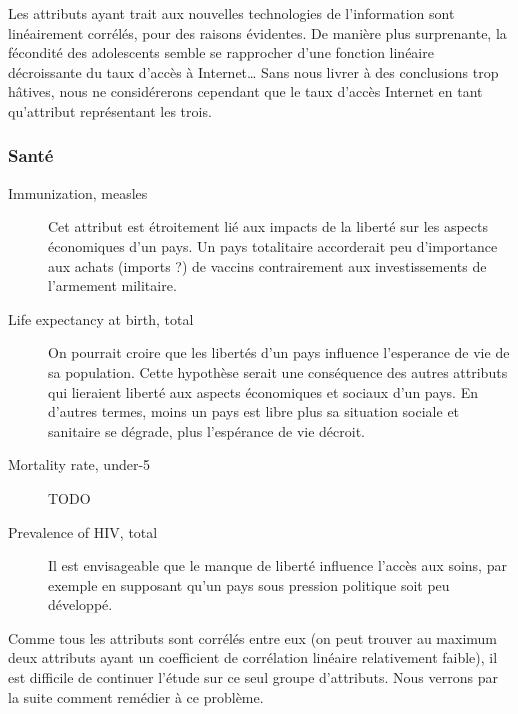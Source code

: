 Les attributs ayant trait aux nouvelles technologies de l'information sont linéairement corrélés, pour des raisons évidentes. De manière plus surprenante, la fécondité des adolescents semble se rapprocher d'une fonction linéaire décroissante du taux d'accès à Internet\ldots
Sans nous livrer à des conclusions trop hâtives, nous ne considérerons cependant que le taux d'accès Internet en tant qu'attribut représentant les trois.

\subsubsection{Santé}
\begin{description}
\item [Immunization, measles]
Cet attribut est étroitement lié aux impacts de la liberté sur les aspects économiques d'un pays. Un pays totalitaire
accorderait peu d'importance aux achats (imports ?) de vaccins contrairement aux investissements de l'armement militaire.
\item [Life expectancy at birth, total]
On pourrait croire que les libertés d'un pays influence l'esperance de vie de sa population. Cette hypothèse serait une conséquence
des autres attributs qui lieraient liberté aux aspects économiques et sociaux d'un pays. En d'autres termes, moins un pays est libre plus sa situation sociale et sanitaire se dégrade, plus l'espérance de vie décroit.
\item [Mortality rate, under-5]
{\huge TODO}
\item [Prevalence of HIV, total]
Il est envisageable que le manque de liberté influence l'accès aux soins, par exemple en supposant qu'un pays sous pression politique soit peu développé.
\end{description}

Comme tous les attributs sont corrélés entre eux (on peut trouver au maximum deux attributs ayant un coefficient de corrélation linéaire relativement faible), il est difficile de continuer l'étude sur ce seul groupe d'attributs. Nous verrons par la suite comment remédier à ce problème.

